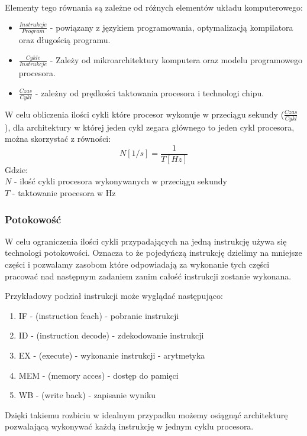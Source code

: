 \documentclass[a4paper,12pt]{article}
\begin{document}
Elementy tego równania są zależne od różnych elementów układu komputerowego:
\begin{itemize}
        \item $\frac{Instrukcje}{Program}$ - powiązany z językiem programowania, optymalizacją kompilatora oraz długością programu. 
        \item $\frac{Cykle}{Instrukcje}$ - Zależy od mikroarchitektury komputera oraz modelu programowego procesora.
        \item $\frac{Czas}{Cykl}$ -  zależny od prędkości taktowania procesora i technologi chipu. 
\end{itemize} 


W celu obliczenia ilości cykli które procesor wykonuje w przeciągu sekundy ($\frac{Czas}{Cykl}$), dla architektury w której jeden cykl zegara głównego to jeden cykl procesora, można skorzystać z równości:
\begin{equation}
        \label{Cykli w sec}
        N [1/s]= \frac{1}{T [Hz]}
\end{equation} 
Gdzie:\\
$N$ - ilość cykli procesora wykonywanych w przeciągu sekundy \\
$T$ - taktowanie procesora w Hz

\subsubsection{Potokowość}

W celu ograniczenia ilości cykli przypadających na jedną instrukcję używa się technologi potokowości. 
Oznacza to że pojedyńczą instrukcję dzielimy na mniejsze części i pozwalamy zasobom które odpowiadają za wykonanie tych części pracować nad następnym zadaniem zanim całość instrukcji zostanie wykonana.

Przykładowy podział instrukcji może wyglądać następująco:
\begin{enumerate}
        \item IF - (instruction feach) - pobranie instrukcji
        \item ID - (instruction decode) -  zdekodowanie instrukcji
        \item EX - (execute) - wykonanie instrukcji - arytmetyka
        \item MEM - (memory acces) - dostęp do pamięci
        \item WB - (write back) - zapisanie wyniku
\end{enumerate}

Dzięki takiemu rozbiciu w idealnym przypadku możemy osiągnąć architekturę pozwalającą wykonywać każdą instrukcję w jednym cyklu procesora. 
\end{document}
